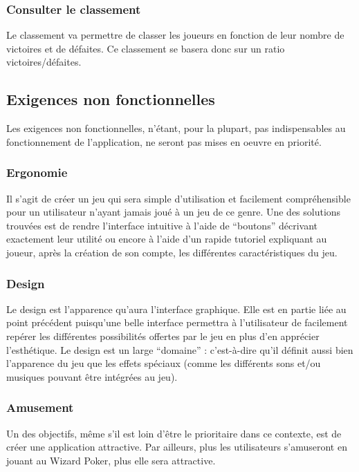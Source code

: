 \documentclass[11pt,a4paper]{article}
\begin{document}
\subsubsection*{Consulter le classement}

Le classement va permettre de classer les joueurs en fonction de
leur nombre de victoires et de défaites. Ce classement se
basera donc sur un ratio victoires/défaites.


\subsection{Exigences non fonctionnelles}
\label{sec:exi-nonfonc}

Les exigences non fonctionnelles, n'étant, pour la plupart, pas indispensables au fonctionnement de l'application, ne seront pas mises en oeuvre en priorité.


\subsubsection*{Ergonomie}
Il s'agit de créer un jeu qui sera simple d'utilisation et facilement compréhensible pour un utilisateur n'ayant jamais joué à un jeu de ce genre.
\medbreak
Une des solutions trouvées est de rendre l'interface intuitive à l'aide de ``boutons'' décrivant exactement leur utilité ou encore à l'aide d'un rapide tutoriel expliquant au joueur, après la création de son compte, les différentes caractéristiques du jeu.


\subsubsection*{Design}
Le design est l'apparence qu'aura l'interface graphique. Elle est en partie liée au point précédent puisqu'une belle interface permettra à l'utilisateur de facilement repérer les différentes possibilités offertes par le jeu en plus d'en apprécier l'esthétique.
\medbreak
Le design est un large ``domaine'' : c'est-à-dire qu'il définit aussi bien l'apparence du jeu  que les effets spéciaux (comme les différents sons et/ou musiques pouvant être intégrées au jeu).


\subsubsection*{Amusement}
Un des objectifs, même s'il est loin d'être le prioritaire dans ce contexte, est de créer une application attractive. Par ailleurs, plus les utilisateurs s'amuseront en jouant au Wizard Poker, plus elle sera attractive.
\end{document}
